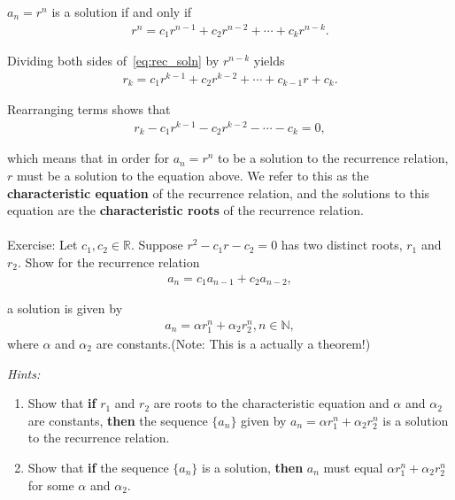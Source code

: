 \documentclass[a4paper,10pt]{report}
\begin{document}
	$a_n = r^n$ is a solution if and only if
	\begin{gather*}\label{eq:rec_soln}
		r^n = c_1r^{n-1} + c_2r^{n-2} + \cdots + c_kr^{n-k}.
	\end{gather*}

	Dividing both sides of~\ref{eq:rec_soln} by $r^{n-k}$ yields
	\begin{gather*}
		r_k = c_1r^{k-1} + c_2r^{k-2} + \cdots + c_{k-1}r + c_k.
	\end{gather*}

	Rearranging terms shows that
	\begin{gather}
		r_k - c_1r^{k-1} - c_2r^{k-2} - \cdots - c_k = 0,
	\end{gather}

	which means that in order for $a_n = r^n$ to be a solution to the recurrence relation, $r$ must be a solution to the equation above. We refer to this as the \textbf{characteristic equation} of the recurrence relation, and the solutions to this equation are the \textbf{characteristic roots} of the recurrence relation. \\ \\

	Exercise: Let $c_1,c_2\in\mathbb{R}$. Suppose $r^2 - c_1r - c_2 = 0$ has two distinct roots, $r_1$ and $r_2$. Show for the recurrence relation
	\begin{gather*}
		a_n = c_1a_{n-1} + c_2a_{n-2},
	\end{gather*}

	a solution is given by
	\begin{gather*}
		a_n = \alpha r_1^n + \alpha_2 r_2^n, n\in\mathbb{N},
	\end{gather*}
	where $\alpha$ and $\alpha_2$ are constants.(Note: This is a actually a theorem!)

	\textit{Hints: }
		\begin{enumerate}
			\item
				Show that \textbf{if} $r_1$ and $r_2$ are roots to the characteristic equation and $\alpha$ and $\alpha_2$ are constants, \textbf{then} the sequence $\{a_n\}$ given by $a_n = \alpha r_1^n + \alpha_2 r_2^n$ is a solution to the recurrence relation.
			\item
				Show that \textbf{if} the sequence $\{a_n\}$ is a solution, \textbf{then} $a_n$ must equal $\alpha r_1^n + \alpha_2 r_2^n$ for some $\alpha$ and $\alpha_2$.
		\end{enumerate}
\end{document}
